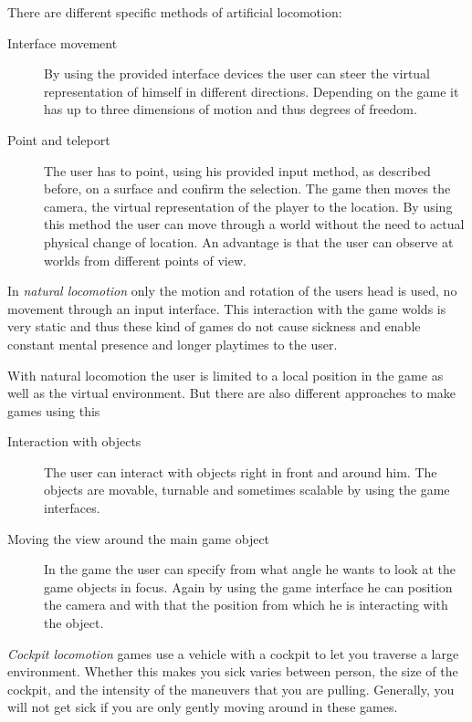 There are different specific methods of artificial locomotion:
\begin{description}
	\item[Interface movement]By using the provided interface devices the user 
	can steer the virtual representation of himself in different directions. 
	Depending on the game it has up to three dimensions of motion and thus 
	degrees of freedom.
	\item[Point and teleport]The user has to point, using his provided input 
	method, as described before, on a surface and confirm the selection. The 
	game then moves the camera, the virtual representation of the player to the 
	location. By using this method the user can move through a world without 
	the need to actual physical change of location. An advantage is that 
	the user can observe at worlds from different points of view.
\end{description}

In \textit{natural locomotion} only the motion and rotation of the users head 
is used, no movement through an input interface. This interaction with the game 
wolds is very static and thus these kind of games do not cause sickness and 
enable constant mental presence and longer playtimes to the user.

With natural locomotion the user is limited to a local position in the game as 
well as the virtual environment. But there are also different approaches to 
make games using this 
\begin{description}
	\item[Interaction with objects]The user can interact with objects right in 
	front and around him. The objects are movable, turnable and sometimes 
	scalable by using the game interfaces.
	\item[Moving the view around the main game object]In the game the user can 
	specify from what angle he wants to look at the game objects in focus. 
	Again by using the game interface he can position the camera and with that 
	the position from which he is interacting with the object.
\end{description}

\textit{Cockpit locomotion} games use a vehicle with a cockpit to let you traverse a large environment. Whether this makes you sick varies between person, the size of the cockpit, and the intensity of the maneuvers that you are pulling. Generally, you will not get sick if you are only gently moving around in these games. 

